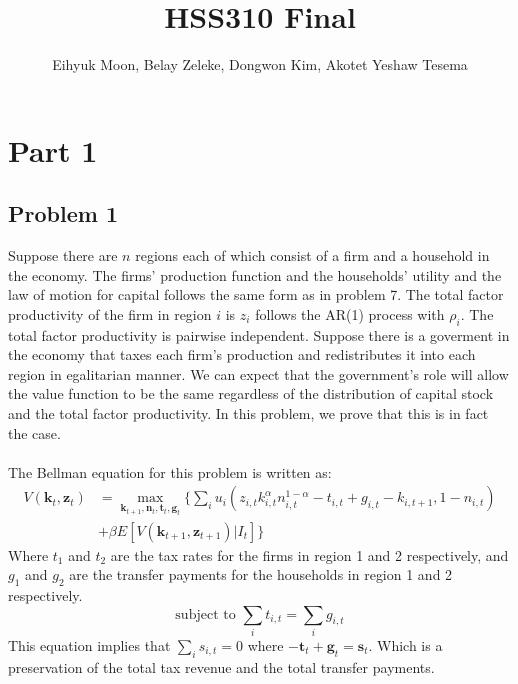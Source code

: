 \documentclass{article}
\begin{document}
\author{Eihyuk Moon, Belay Zeleke, Dongwon Kim, Akotet Yeshaw Tesema}
\title{HSS310 Final}
\maketitle

\section{Part 1}
\subsection{Problem 1}

\hspace{1em} Suppose there are \(n\) regions each of which consist of a firm and a household in the economy.
The firms' production function and the households' utility and the law of motion for capital follows the same form as in problem 7.
The total factor productivity of the firm in region \(i\) is \(z_i\) follows the AR(1) process with \(\rho_i\).
The total factor productivity is pairwise independent.
Suppose there is a goverment in the economy that taxes each firm's production and redistributes it into each region in egalitarian manner.
We can expect that the government's role will allow the value function to be the same regardless of the distribution of capital stock and the total factor productivity.
In this problem, we prove that this is in fact the case.\\ \\
The Bellman equation for this problem is written as:
\begin{align*}
    V(\mathbf{k}_t, \mathbf{z}_t) &= \max_{\mathbf{k}_{t+1}, \mathbf{n}_{t}, \mathbf{t}_{t}, \mathbf{g}_{t}} \{ \sum_{i} u_{i}\left(z_{i,t} k_{i,t}^\alpha n_{i,t}^{1-\alpha} -t_{i, t} + g_{i, t} - k_{i, t+1}, 1 - n_{i,t}\right) \\
    &+ \beta E[V(\mathbf{k}_{t+1}, \mathbf{z}_{t+1}) | I_t] \}
\end{align*}
Where \(t_1\) and \(t_2\) are the tax rates for the firms in region 1 and 2 respectively, and \(g_1\) and \(g_2\) are the transfer payments for the households in region 1 and 2 respectively.
\begin{equation}
    \text{subject to } \sum_{i} t_{i, t} = \sum_{i} g_{i, t}
\end{equation}
This equation implies that \( \sum_{i} s_{i,t} = 0 \) where \( -\mathbf{t}_{t} + \mathbf{g}_{t} = \mathbf{s}_{t}\). Which is a preservation of the total tax revenue and the total transfer payments.\\ \\
\end{document}
